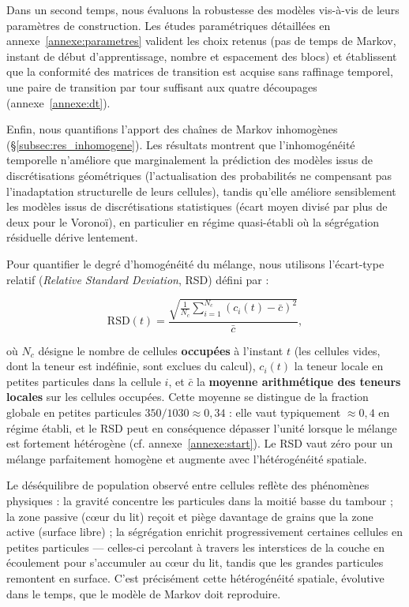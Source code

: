 \documentclass[french]{MemoireMaster}
\begin{document}
Dans un second temps, nous évaluons la robustesse des modèles vis-à-vis de leurs paramètres de construction. Les études paramétriques détaillées en annexe~\ref{annexe:parametres} valident les choix retenus (pas de temps de Markov, instant de début d'apprentissage, nombre et espacement des blocs) et établissent que la conformité des matrices de transition est acquise sans raffinage temporel, une paire de transition par tour suffisant aux quatre découpages (annexe~\ref{annexe:dt}).

Enfin, nous quantifions l'apport des chaînes de Markov inhomogènes (\S\ref{subsec:res_inhomogene}). Les résultats montrent que l'inhomogénéité temporelle n'améliore que marginalement la prédiction des modèles issus de discrétisations géométriques (l'actualisation des probabilités ne compensant pas l'inadaptation structurelle de leurs cellules), tandis qu'elle améliore sensiblement les modèles issus de discrétisations statistiques (écart moyen divisé par plus de deux pour le Voronoï), en particulier en régime quasi-établi où la ségrégation résiduelle dérive lentement.

Pour quantifier le degré d'homogénéité du mélange, nous utilisons l'écart-type relatif (\textit{Relative Standard Deviation}, RSD) défini par :

\begin{equation}
  \mathrm{RSD}(t)
  =
  \frac{
    \sqrt{
      \frac{1}{N_c}
      \sum_{i=1}^{N_c}
      \left(
        c_i(t) - \bar{c}
      \right)^2
    }
  }{
    \bar{c}
  },
  \label{eq:rsd}
\end{equation}

où $N_c$ désigne le nombre de cellules \textbf{occupées} à l'instant $t$ (les cellules vides, dont la teneur est indéfinie, sont exclues du calcul), $c_i(t)$ la teneur locale en petites particules dans la cellule $i$, et $\bar{c}$ la \textbf{moyenne arithmétique des teneurs locales} sur les cellules occupées. Cette moyenne se distingue de la fraction globale en petites particules $350/1030 \approx 0{,}34$ : elle vaut typiquement $\approx 0{,}4$ en régime établi, et le RSD peut en conséquence dépasser l'unité lorsque le mélange est fortement hétérogène (cf. annexe~\ref{annexe:start}). Le RSD vaut zéro pour un mélange parfaitement homogène et augmente avec l'hétérogénéité spatiale.

Le déséquilibre de population observé entre cellules reflète des phénomènes physiques : la gravité concentre les particules dans la moitié basse du tambour ; la zone passive (cœur du lit) reçoit et piège davantage de grains que la zone active (surface libre) ; la ségrégation enrichit progressivement certaines cellules en petites particules --- celles-ci percolant à travers les interstices de la couche en écoulement pour s'accumuler au cœur du lit, tandis que les grandes particules remontent en surface. C'est précisément cette hétérogénéité spatiale, évolutive dans le temps, que le modèle de Markov doit reproduire.
\end{document}
